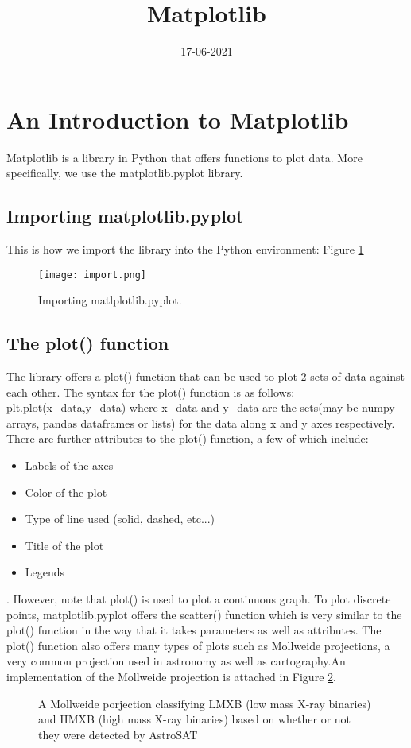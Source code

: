 \documentclass[10pt,a4paper]{article}
\title{Matplotlib}
\date{ 17-06-2021}
\begin{document}
\maketitle

\section{An Introduction to Matplotlib}
Matplotlib is a library in Python that offers functions to plot data. More specifically, we use the matplotlib.pyplot library.
\subsection{Importing matplotlib.pyplot}
This is how we import the library into the Python environment: Figure
\ref{fig:import1}
\begin{figure}[!h]
\centering
\texttt{[image: import.png]}
\caption{\label{fig:import1}Importing matlplotlib.pyplot.}
\end{figure}
\subsection{The plot() function}
The library offers a plot() function that can be used to plot 2 sets of data against each other. The syntax for the plot() function is as follows:
    plt.plot(x\_data,y\_data)
where x\_data and y\_data are the sets(may be numpy arrays, pandas dataframes or lists) for the data along x and y axes respectively.
There are further attributes to the plot() function, a few of which include:
\begin{itemize}
\item Labels of the axes
\item Color of the plot
\item Type of line used (solid, dashed, etc...)
\item Title of the plot
\item Legends
\end{itemize}
. However, note that plot() is used to plot a continuous graph. To plot discrete points, matplotlib.pyplot offers the scatter() function which is very similar to the plot() function in the way that it takes parameters as well as attributes.
The plot() function also offers many types of plots such as Mollweide projections, a very common projection used in astronomy as well as cartography.An implementation of the Mollweide projection is attached in Figure \ref{fig:example}.
\begin{figure}[!h]
    \centering
    \qquad
    \caption{A Mollweide porjection classifying LMXB (low mass X-ray binaries) and HMXB (high mass X-ray binaries) based on whether or not they were detected by AstroSAT}
    \label{fig:example}
\end{figure}
\end{document}
